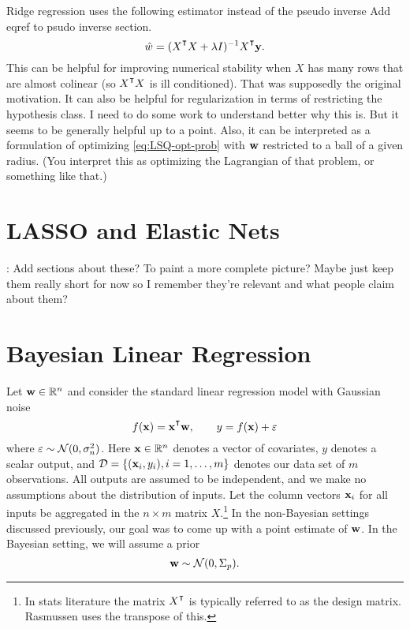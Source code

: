 Ridge regression uses the following estimator instead of the pseudo inverse  Add eqref to psudo inverse section. 
\begin{equation} \label{eq:ridge-regression}
\hat w = (X^\T X + \lambda I)^{-1}X^\T\y.
\end{equation}
This can be helpful for improving numerical stability when $X$ has many rows that are almost colinear (so $X^\T X$ is ill conditioned). That was supposedly the original motivation. It can also be helpful for regularization in terms of restricting the hypothesis class. I need to do some work to understand better why this is. But it seems to be generally helpful up to a point. Also, it can be interpreted as a formulation of optimizing \eqref{eq:LSQ-opt-prob} with ${ \bf w}$ restricted to a ball of a given radius. (You interpret this as optimizing the Lagrangian of that problem, or something like that.) 

\section{LASSO and Elastic Nets}
: Add sections about these? To paint a more complete picture? Maybe just keep them really short for now so I remember they're relevant and what people claim about them?



\section{Bayesian Linear Regression}
Let ${ \bf w}\in \mathbb{R}^n$ and consider the standard linear regression model with Gaussian noise
$$
f(\x) = \x^\T \w, \quad\quad y = f(\x) + \eps
$$
where $\varepsilon \sim \mathcal{N}(0, \sigma_n^2)$. Here ${ \bf x} \in \mathbb{R}^n$ denotes a vector of covariates, $y$ denotes a scalar output, and $\mathcal{D} = \{({ \bf x}_i, y_i),i=1,\ldots,m \}$ denotes our data set of $m$ observations. All outputs are assumed to be independent, and we make no assumptions about the distribution of inputs. Let the column vectors ${ \bf x}_i$ for all inputs be aggregated in the $n \times m$ matrix $X$.\footnote{In stats literature the matrix $X^\T$ is typically referred to as the design matrix. Rasmussen uses the transpose of this.} In the non-Bayesian settings discussed previously, our goal was to come up with a point estimate of ${ \bf w}$. In the Bayesian setting, we will assume a prior 
$$
{ \bf w}\sim \mathcal{N}(0, \Sigma_p).
$$

